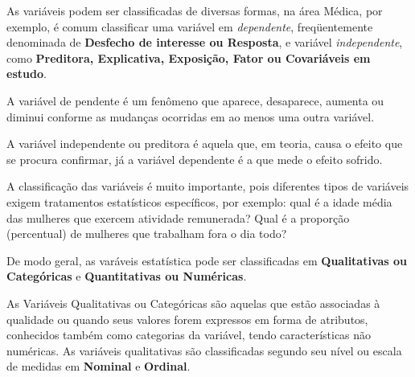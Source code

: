 As variáveis podem ser classificadas de diversas formas, na área Médica, por exemplo, é comum classificar uma variável em  \textit{dependente}, freqüentemente denominada de \textbf{Desfecho de interesse ou Resposta}, e variável \textit{independente}, como \textbf{Preditora, Explicativa, Exposição, Fator ou Covariáveis em estudo}. \vskip0.3cm 


A variável de pendente é um fenômeno que aparece, desaparece, aumenta ou diminui conforme as mudanças ocorridas em ao menos uma outra variável.\vskip0.3cm 

A variável independente ou preditora é aquela que, em teoria, causa o efeito que se procura confirmar, já a variável dependente é a que mede o efeito sofrido.\vskip0.3cm



A classificação das variáveis é muito importante, pois diferentes tipos de variáveis exigem tratamentos estatísticos específicos, por exemplo: qual é a idade média das mulheres
que exercem atividade remunerada? Qual é a proporção (percentual) de mulheres que trabalham fora o dia todo?
\vskip0.3cm



\inic De modo geral, as varáveis estatística pode ser classificadas em \textbf{Qualitativas ou Categóricas} e \textbf{Quantitativas ou Numéricas}.\vskip0.3cm

\inic As Variáveis Qualitativas ou Categóricas são aquelas que estão associadas à qualidade ou quando seus valores forem expressos em forma de atributos, conhecidos também como categorias da variável, tendo características não numéricas. As variáveis qualitativas são classificadas segundo seu nível ou escala de medidas em \textbf{Nominal} e \textbf{Ordinal}.\vskip0.3cm


